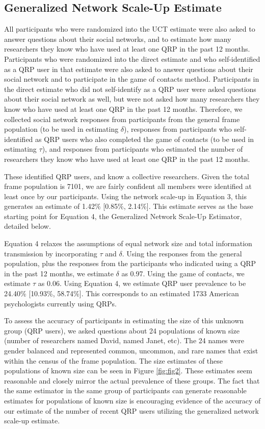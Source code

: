 \documentclass[man]{apa6}
\theoremstyle{definition}
\theoremstyle{definition}
\theoremstyle{definition}
\theoremstyle{remark}
\begin{document}
\subsection{Generalized Network Scale-Up
Estimate}\label{generalized-network-scale-up-estimate}

All participants who were randomized into the UCT estimate were also
asked to answer questions about their social networks, and to estimate
how many researchers they know who have used at least one QRP in the
past 12 months. Participants who were randomized into the direct
estimate and who self-identified as a QRP user in that estimate were
also asked to answer questions about their social network and to
participate in the game of contacts method. Participants in the direct
estimate who did not self-identify as a QRP user were asked questions
about their social network as well, but were not asked how many
researchers they know who have used at least one QRP in the past 12
months. Therefore, we collected social network responses from
participants from the general frame population (to be used in estimating
\(\delta\)), responses from participants who self-identified as QRP
users who also completed the game of contacts (to be used in estimating
\(\tau\)), and responses from participants who estimated the number of
researchers they know who have used at least one QRP in the past 12
months.

These identified QRP users, and know a collective researchers. Given the
total frame population is 7101, we are fairly confident all members were
identified at least once by our participants. Using the network scale-up
in Equation 3, this generates an estimate of 1.42\% {[}0.85\%,
2.14\%{]}. This estimate serves as the base starting point for Equation
4, the Generalized Network Scale-Up Estimator, detailed below.

Equation 4 relaxes the assumptions of equal network size and total
information transmission by incorporating \(\tau\) and \(\delta\). Using
the responses from the general population, plus the responses from the
participants who indicated using a QRP in the past 12 months, we
estimate \(\delta\) as 0.97. Using the game of contacts, we estimate
\(\tau\) as 0.06. Using Equation 4, we estimate QRP user prevalence to
be 24.40\% {[}10.93\%, 58.74\%{]}. This corresponds to an estimated 1733
American psychologists currently using QRPs.

To assess the accuracy of participants in estimating the size of this
unknown group (QRP users), we asked questions about 24 populations of
known size (number of researchers named David, named Janet, etc). The 24
names were gender balanced and represented common, uncommon, and rare
names that exist within the census of the frame population. The size
estimates of these populations of known size can be seen in Figure
\ref{fig:fig2}. These estimates seem reasonable and closely mirror the
actual prevalence of these groups. The fact that the same estimator in
the same group of participants can generate reasonable estimates for
populations of known size is encouraging evidence of the accuracy of our
estimate of the number of recent QRP users utilizing the generalized
network scale-up estimate.
\end{document}
